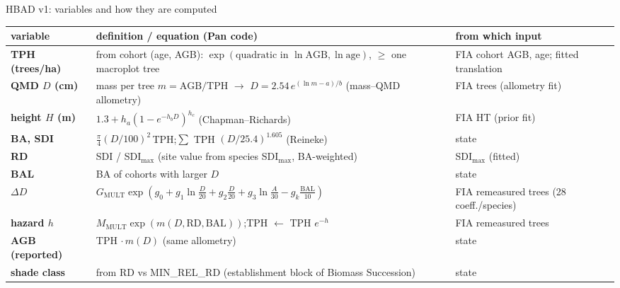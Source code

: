 \begin{frame}{HBAD v1: variables and how they are computed}
\scriptsize
\renewcommand{\arraystretch}{1.07}
\begin{tabularx}{\textwidth}{@{}>{\bfseries}p{2.3cm}X>{\raggedright\arraybackslash}p{3.9cm}@{}}
\toprule
variable & definition / equation (Pan code) & from which input \\
\midrule
TPH (trees/ha) & from cohort (age, AGB): $\exp(\text{quadratic in } \ln\text{AGB}, \ln\text{age})$, $\ge$ one macroplot tree & FIA cohort AGB, age; fitted translation \\
QMD $D$ (cm) & mass per tree $m=\text{AGB}/\text{TPH}$ $\rightarrow$ $D=2.54\,e^{(\ln m-a)/b}$ (mass–QMD allometry) & FIA trees (allometry fit) \\
height $H$ (m) & $1.3+h_a(1-e^{-h_bD})^{h_c}$ (Chapman–Richards) & FIA HT (prior fit) \\
BA, SDI & $\frac{\pi}{4}(D/100)^2\,$TPH;\quad $\sum$ TPH $(D/25.4)^{1.605}$ (Reineke) & state \\
RD & SDI / SDI$_{\max}$ (site value from species SDI$_{\max}$, BA-weighted) & SDI$_{\max}$ (fitted) \\
BAL & BA of cohorts with larger $D$ & state \\
$\Delta D$ & $G_{\text{MULT}}\exp(g_0+g_1\ln\frac D{20}+g_2\frac D{20}+g_3\ln\frac A{30}-g_k\frac{\text{BAL}}{10})$ & FIA remeasured trees (28 coeff./species) \\
hazard $h$ & $M_{\text{MULT}}\exp(m(D,\text{RD},\text{BAL}))$;\quad TPH $\leftarrow$ TPH $e^{-h}$ & FIA remeasured trees \\
AGB (reported) & TPH $\cdot\,m(D)$ (same allometry) & state \\
shade class & from RD vs MIN\_REL\_RD (establishment block of Biomass Succession) & state \\
\bottomrule
\end{tabularx}
\end{frame}
